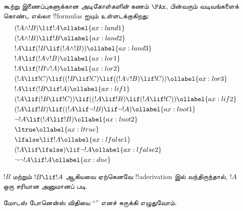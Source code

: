 \documentclass[../../../include/open-logic-section]{subfiles}
\begin{document}
      {}
      {}


\begin{defn}[அடிகோள்கள்]
கூற்று இணைப்புகளுக்கான \emph{அடிகோள்களின்} கணம் $\PAx$, பின்வரும்
வடிவங்களைக் கொண்ட எல்லா !!{formula}s ஐயும் உள்ளடக்குகிறது:
\begin{align}
  & (!A \land !B) \lif !A \ollabel{ax:land1}\\
  & (!A \land !B) \lif !B \ollabel{ax:land2}\\
  & !A \lif (!B \lif (!A \land !B)) \ollabel{ax:land3}\\
  & !A \lif (!A \lor !B) \ollabel{ax:lor1}\\
  & !A \lif (!B \lor !A) \ollabel{ax:lor2}\\
  & (!A \lif !C) \lif ((!B \lif !C) \lif ((!A \lor !B) \lif !C)) \ollabel{ax:lor3}\\
  & !A \lif (!B \lif !A) \ollabel{ax:lif1}\\
  & (!A \lif (!B \lif !C)) \lif ((!A \lif !B) \lif (!A \lif !C)) \ollabel{ax:lif2}\\
  & (!A \lif !B) \lif ((!A \lif \lnot !B) \lif \lnot !A) \ollabel{ax:lnot1}\\
  & \lnot !A \lif (!A \lif !B) \ollabel{ax:lnot2}\\
  & \ltrue \ollabel{ax:ltrue}\\
  & \lfalse \lif !A \ollabel{ax:lfalse1}\\
  & (!A \lif \lfalse) \lif \lnot !A \ollabel{ax:lfalse2}\\
  & \lnot\lnot !A \lif !A \ollabel{ax:dne}
\end{align}
\end{defn}

\begin{defn}[மோடஸ் போனென்ஸ்]
  $!B$ மற்றும் $!B \lif !A$ ஆகியவை ஏற்கெனவே !!a{derivation} இல்
  வந்திருந்தால், $!A$ ஒரு சரியான அனுமானப் படி.
\end{defn}

மோடஸ் போனென்ஸ் விதியை ``\MP'' எனச் சுருக்கி எழுதுவோம்.
\end{document}
